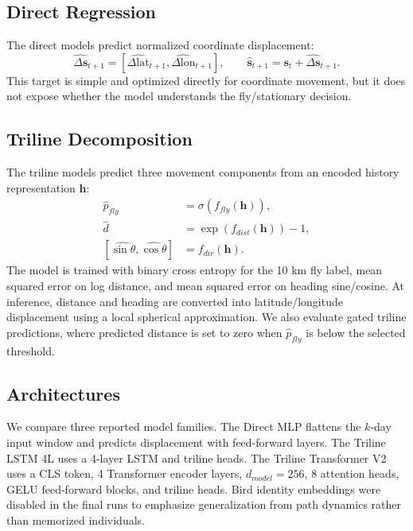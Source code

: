 \documentclass{article}
\begin{document}
\subsection{Direct Regression}

The direct models predict normalized coordinate displacement:
\[
  \widehat{\Delta \mathbf{s}}_{t+1}
  = [\widehat{\Delta \mathrm{lat}}_{t+1}, \widehat{\Delta \mathrm{lon}}_{t+1}],
  \qquad
  \widehat{\mathbf{s}}_{t+1} = \mathbf{s}_{t} + \widehat{\Delta \mathbf{s}}_{t+1}.
\]
This target is simple and optimized directly for coordinate movement, but it does not expose whether the model understands the fly/stationary decision.

\subsection{Triline Decomposition}

The triline models predict three movement components from an encoded history representation $\mathbf{h}$:
\begin{align}
  \widehat{p}_{fly} &= \sigma(f_{fly}(\mathbf{h})), \\
  \widehat{d} &= \exp(f_{dist}(\mathbf{h})) - 1, \\
  [\widehat{\sin \theta}, \widehat{\cos \theta}] &= f_{dir}(\mathbf{h}).
\end{align}
The model is trained with binary cross entropy for the 10 km fly label, mean squared error on log distance, and mean squared error on heading sine/cosine. At inference, distance and heading are converted into latitude/longitude displacement using a local spherical approximation. We also evaluate gated triline predictions, where predicted distance is set to zero when $\widehat{p}_{fly}$ is below the selected threshold.

\subsection{Architectures}

We compare three reported model families. The Direct MLP flattens the $k$-day input window and predicts displacement with feed-forward layers. The Triline LSTM 4L uses a 4-layer LSTM and triline heads. The Triline Transformer V2 uses a CLS token, 4 Transformer encoder layers, $d_{model}=256$, 8 attention heads, GELU feed-forward blocks, and triline heads. Bird identity embeddings were disabled in the final runs to emphasize generalization from path dynamics rather than memorized individuals.
\end{document}
